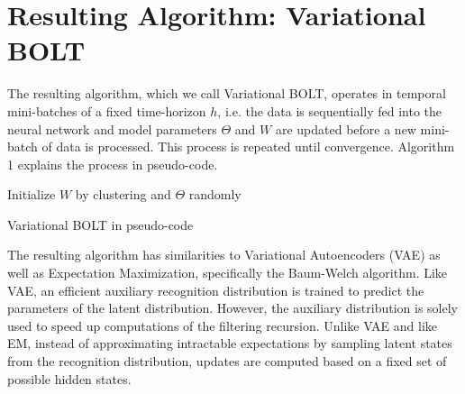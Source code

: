 \section{Resulting Algorithm: Variational BOLT}

The resulting algorithm, which we call Variational BOLT, operates in temporal mini-batches of a fixed time-horizon $h$, i.e. the data is sequentially fed into the neural network and model parameters $\Theta$ and $W$ are updated before a new mini-batch of data is processed. This process is repeated until convergence. Algorithm 1 explains the process in pseudo-code.


\begin{algorithm}[htb]
Initialize $W$ by clustering and $\Theta$ randomly\;
\caption{Variational BOLT in pseudo-code}
\end{algorithm}


The resulting algorithm has similarities to Variational Autoencoders (VAE) as well as Expectation Maximization, specifically the Baum-Welch algorithm. Like VAE, an efficient auxiliary recognition distribution is trained to predict the parameters of the latent distribution. However, the auxiliary distribution is solely used to speed up computations of the filtering recursion. Unlike VAE and like EM, instead of approximating intractable expectations by sampling latent states from the recognition distribution, updates are computed based on a fixed set of possible hidden states.

